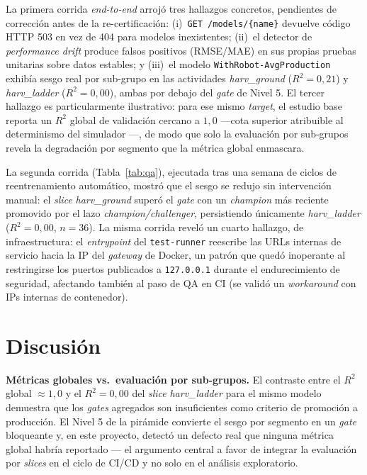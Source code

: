 \documentclass[conference]{IEEEtran}
\begin{document}
La primera corrida \textit{end-to-end} arrojó tres hallazgos concretos, pendientes de corrección antes de la re-certificación: (i)~\texttt{GET~/models/\{name\}} devuelve código HTTP 503 en vez de 404 para modelos inexistentes; (ii)~el detector de \textit{performance drift} produce falsos positivos (RMSE/MAE) en sus propias pruebas unitarias sobre datos estables; y (iii)~el modelo \texttt{WithRobot-AvgProduction} exhibía sesgo real por sub-grupo en las actividades \textit{harv\_ground} ($R^2=0{,}21$) y \textit{harv\_ladder} ($R^2=0{,}00$), ambas por debajo del \textit{gate} de Nivel 5. El tercer hallazgo es particularmente ilustrativo: para ese mismo \textit{target}, el estudio base reporta un $R^2$ global de validación cercano a $1{,}0$ —cota superior atribuible al determinismo del simulador \cite{garcia2026}—, de modo que solo la evaluación por sub-grupos revela la degradación por segmento que la métrica global enmascara.

La segunda corrida (Tabla~\ref{tab:qa}), ejecutada tras una semana de ciclos de reentrenamiento automático, mostró que el sesgo se redujo sin intervención manual: el \textit{slice} \textit{harv\_ground} superó el \textit{gate} con un \textit{champion} más reciente promovido por el lazo \textit{champion/challenger}, persistiendo únicamente \textit{harv\_ladder} ($R^2=0{,}00$, $n=36$). La misma corrida reveló un cuarto hallazgo, de infraestructura: el \textit{entrypoint} del \texttt{test-runner} reescribe las URLs internas de servicio hacia la IP del \textit{gateway} de Docker, un patrón que quedó inoperante al restringirse los puertos publicados a \texttt{127.0.0.1} durante el endurecimiento de seguridad, afectando también al paso de QA en CI (se validó un \textit{workaround} con IPs internas de contenedor).

\section{Discusión}

\textbf{Métricas globales vs.\ evaluación por sub-grupos.} El contraste entre el $R^2$ global $\approx 1{,}0$ y el $R^2=0{,}00$ del \textit{slice} \textit{harv\_ladder} para el mismo modelo demuestra que los \textit{gates} agregados son insuficientes como criterio de promoción a producción. El Nivel 5 de la pirámide convierte el sesgo por segmento en un \textit{gate} bloqueante y, en este proyecto, detectó un defecto real que ninguna métrica global habría reportado — el argumento central a favor de integrar la evaluación por \textit{slices} en el ciclo de CI/CD y no solo en el análisis exploratorio.
\end{document}
